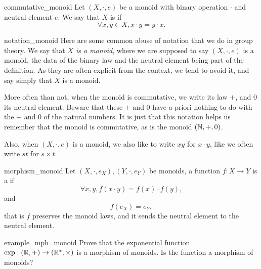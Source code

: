 \begin{cdef}{}{commutative_monoid}
    Let \( (X, \cdot, e) \) be a monoid with binary operation \( \cdot \) and neutral element \( e \). We say that \( X \) is  if 
    \begin{equation*}
        \forall x,y \in X, x \cdot y = y \cdot x.
    \end{equation*} 
\end{cdef}

\begin{crem}{}{notation_monoid}
    Here are some common abuse of notation that we do in group theory. We say that \textit{\( X \) is a monoid}, where we are supposed to say \( (X, \cdot, e) \) is a monoid, the data of the binary law and the neutral element being part of the definition. As they are often explicit from the context, we tend to avoid it, and say simply that \( X \) is a monoid.

    More often than not, when the monoid is commutative, we write its law \( + \), and \( 0 \) its neutral element. Beware that these \( + \) and \( 0 \) have a priori nothing to do with the \( + \) and \( 0 \) of the natural numbers. It is just that this notation helps us remember that the monoid is commutative, as is the monoid \( (\mathbb{N}, +, 0) \).
    
    Also, when \( (X, \cdot, e) \) is a monoid, we also like to write \( xy \) for \( x \cdot y \), like we often write \( st \) for \( s \times t \).    
\end{crem}

\begin{cdef}{}{morphism_monoid}
    Let \( (X, \cdot, e_X), (Y, \cdot, e_Y) \) be monoids, a function \( f : X \to Y \) is a  if
    \begin{equation*}
        \forall x, y, f(x \cdot y) = f(x) \cdot f(y),
    \end{equation*}
    and 
    \begin{equation*}
        f(e_X) = e_Y,
    \end{equation*}
    that is \( f \) preserves the monoid laws, and it sends the neutral element to the neutral element. 
\end{cdef}

\begin{cex}{}{example_mph_monoid}
    Prove that the exponential function \( \exp : (\mathbb{R}, +) \to (\mathbb{R}^*, \times) \) is a morphism of monoids. Is the function 
    a morphism of monoids?
\end{cex}

